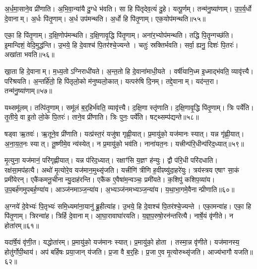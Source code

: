 अ॒र्ध॒मा॒साने॒व प्री॑णाति।
अ॒भि॒वा॒न्या॑यै दु॒ग्धे भ॑वति।
सा हि पि॑तृदेव॒त्यं॑ दु॒हे।
यत्पू॒र्णम्।
तन्म॑नु॒ष्या॑णाम्।
उ॒प॒र्य॒र्धो दे॒वानाम्।
अ॒र्धः पि॑तृ॒णाम्।
अ॒र्ध उप॑मन्थति।
अ॒र्धो हि पि॑तृ॒णाम्।
एक॒योप॑मन्थति॥५५॥

एका॒ हि पि॑तृ॒णाम्।
द॒क्षि॒णोप॑मन्थति।
द॒क्षि॒णावृ॒द्धि पि॑तृ॒णाम्।
अना॑र॒भ्योप॑मन्थति।
तद्धि पि॒तॄन्गच्छ॑ति।
इ॒मान्दिशं॒ वेदि॒मुद्ध॑न्ति।
उ॒भये॒ हि दे॒वाश्च॑ पि॒तर॑श्चे॒ज्यन्ते।
चतुः॑ स्रक्तिर्भवति।
सर्वा॒ ह्यनु॒ दिशः॑ पि॒तरः॑।
अखा॑ता भवति॥५६॥

खा॒ता हि दे॒वानाम्।
म॒ध्य॒तो\-ऽग्निराधी॑यते।
अ॒न्त॒तो हि दे॒वाना॑माधी॒यते।
वर्\mbox{}षी॑यानि॒ध्म इ॒ध्माद्भ॑वति॒ व्यावृ॑त्त्यै।
परि॑श्रयति।
अ॒न्तर्\mbox{}हि॑तो॒ हि पि॑तृलो॒को म॑नुष्यलो॒कात्।
यत्परु॑षि दि॒नम्।
तद्दे॒वानाम्।
यद॑न्त॒रा।
तन्म॑नु॒ष्या॑णाम्॥५७॥

यथ्समू॑लम्।
तत्पि॑तृ॒णाम्।
समू॑लं ब॒र्॒हिर्भ॑वति॒ व्यावृ॑त्त्यै।
द॒क्षि॒णा स्तृ॑णाति।
द॒क्षि॒णावृ॒द्धि पि॑तृ॒णाम्।
त्रिः पर्ये॑ति।
तृ॒तीये॒ वा इ॒तो लो॒के पि॒तरः॑।
ताने॒व प्री॑णाति।
त्रिः पुनः॒ पर्ये॑ति।
षट्थ्सम्प॑द्यन्ते॥५८॥

षड्वा ऋ॒तवः॑।
ऋ॒तूने॒व प्री॑णाति।
यत्प्र॑स्त॒रं यजु॑षा गृह्णी॒यात्।
प्र॒मायु॑को॒ यज॑मानः स्यात्।
यन्न गृ॑ह्णी॒यात्।
अ॒ना॒य॒त॒नः स्यात्।
तू॒ष्णीमे॒व न्य॑स्येत्।
न प्र॒मायु॑को॒ भव॑ति।
नाना॑यत॒नः।
यत्त्रीन्प॑रि॒धीन्प॑रिद॒ध्यात्॥५९॥

मृ॒त्युना॒ यज॑मानं॒ परि॑गृह्णीयात्।
यन्न प॑रिद॒ध्यात्।
रक्षाꣳ॑सि य॒ज्ञꣳ ह॑न्युः।
द्वौ प॑रि॒धी परि॑दधाति।
रक्ष॑सा॒मप॑हत्यै।
अथो॑ मृ॒त्योरे॒व यज॑मान॒मुथ्सृ॑जति।
यत्त्रीणि॑ त्रीणि ह॒वीꣴष्यु॑दा॒हरे॑युः।
त्रय॑स्त्रय एषाꣳ सा॒कं प्रमी॑येरन्।
एकै॑कमनू॒चीनान्यु॒दाह॑रन्ति।
एकै॑क ए॒वैषा॑म॒न्वञ्चः॒ प्रमी॑यते।
क॒शिपु॑ कशिप॒व्या॑य।
उ॒प॒बर्\mbox{}ह॑णमुपबर्\mbox{}ह॒ण्या॑य।
आञ्ज॑नमाञ्ज॒न्या॑य।
अ॒भ्यञ्ज॑नमभ्यञ्ज॒न्या॑य।
य॒था॒भा॒गमे॒\-वैनान्प्रीणाति॥६०॥

अ॒ग्नये॑ दे॒वेभ्यः॑ पि॒तृभ्यः॑ समि॒ध्यमा॑ना॒यानु॑ ब्रू॒हीत्या॑ह।
उ॒भये॒ हि दे॒वाश्च॑ पि॒तर॑श्चे॒ज्यन्ते।
एका॒मन्वा॑ह।
एका॒ हि पि॑तृ॒णाम्।
त्रिरन्वा॑ह।
त्रिर्\mbox{}हि दे॒वानाम्।
आ॒घा॒रावाघा॑रयति।
य॒ज्ञ॒प॒रुषो॒रन॑न्तरित्यै।
नार्\mbox{}षे॒यं वृ॑णीते।
न होता॑रम्॥६१॥

यदा॑र्\mbox{}षे॒यं वृ॑णी॒त।
यद्धोता॑रम्।
प्र॒मायु॑को॒ यज॑मानः स्यात्।
प्र॒मायु॑को॒ होता।
तस्मा॒न्न वृ॑णीते।
यज॑मानस्य॒ होतु॑र्गोपी॒थाय॑।
अप॑ बर्\mbox{}हिषः प्रया॒जान् य॑जति।
प्र॒जा वै ब॒र्॒हिः।
प्र॒जा ए॒व मृ॒त्योरुथ्सृ॑जति।
आज्य॑भागौ यजति॥६२॥

